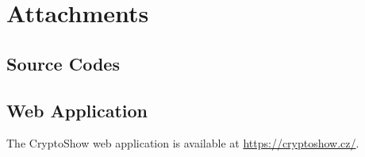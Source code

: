 \chapter{Attachments}

\section{Source Codes}


\section{Web Application}

The CryptoShow web application is available at \url{https://cryptoshow.cz/}.